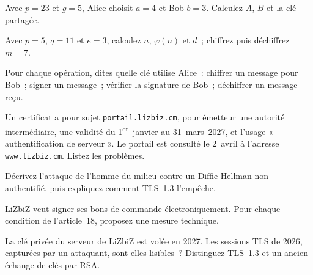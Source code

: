 \begin{boxexo}[title={\ding{45}\quad Exercice~4.2. Diffie-Hellman \niveaubase}]
Avec \(p = 23\) et \(g = 5\), Alice choisit \(a = 4\) et Bob \(b = 3\).
Calculez \(A\), \(B\) et la clé partagée.
\end{boxexo}

\begin{boxexo}[title={\ding{45}\quad Exercice~4.3. RSA \niveaumoyen}]
Avec \(p = 5\), \(q = 11\) et \(e = 3\), calculez \(n\), \(\varphi(n)\) et
\(d\)~; chiffrez puis déchiffrez \(m = 7\).
\end{boxexo}

\begin{boxexo}[title={\ding{45}\quad Exercice~4.4. Quelle clé~? \niveaubase}]
Pour chaque opération, dites quelle clé utilise Alice~: chiffrer un
message pour Bob~; signer un message~; vérifier la signature de Bob~;
déchiffrer un message reçu.
\end{boxexo}

\begin{boxexo}[title={\ding{45}\quad Exercice~4.5. Lire un certificat \niveaumoyen}]
Un certificat a pour sujet \texttt{portail.lizbiz.cm}, pour émetteur une
autorité intermédiaire, une validité du 1\textsuperscript{er}~janvier au
31~mars~2027, et l'usage « authentification de serveur ». Le portail est
consulté le 2~avril à l'adresse \texttt{www.lizbiz.cm}. Listez les
problèmes.
\end{boxexo}

\begin{boxexo}[title={\ding{45}\quad Exercice~4.6. L'homme du milieu \niveaumoyen}]
Décrivez l'attaque de l'homme du milieu contre un Diffie-Hellman non
authentifié, puis expliquez comment TLS~1.3 l'empêche.
\end{boxexo}

\begin{boxexo}[title={\ding{45}\quad Exercice~4.7. Signature avancée \niveaumoyen}]
LiZbiZ veut signer ses bons de commande électroniquement. Pour chaque
condition de l'article~18, proposez une mesure technique.
\end{boxexo}

\begin{boxexo}[title={\ding{45}\quad Exercice~4.8. Confidentialité persistante \niveaumoyen}]
La clé privée du serveur de LiZbiZ est volée en 2027. Les sessions TLS de
2026, capturées par un attaquant, sont-elles lisibles~? Distinguez TLS~1.3
et un ancien échange de clés par RSA.
\end{boxexo}

